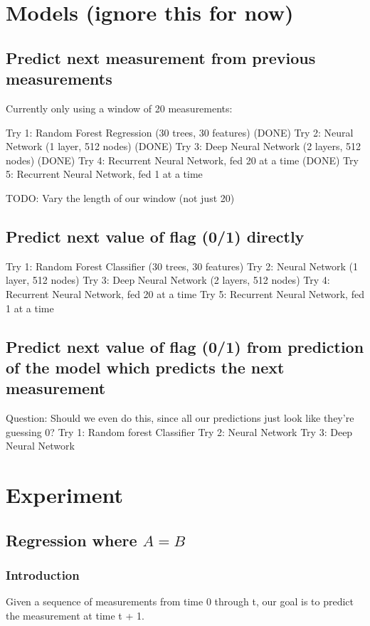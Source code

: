 \documentclass[12pt]{article}
\renewcommand{\=}[1]{\stackrel{#1}{=}} %
\theoremstyle{definition}
\begin{document}
\section{Models (ignore this for now)}
\subsection{Predict next measurement from previous measurements}
Currently only using a window of 20 measurements:

Try 1: Random Forest Regression (30 trees, 30 features) (DONE)
Try 2: Neural Network (1 layer, 512 nodes) (DONE)
Try 3: Deep Neural Network (2 layers, 512 nodes) (DONE)
Try 4: Recurrent Neural Network, fed 20 at a time (DONE)
Try 5: Recurrent Neural Network, fed 1 at a time

TODO: Vary the length of our window (not just 20)

\subsection{Predict next value of flag (0/1) directly}
Try 1: Random Forest Classifier (30 trees, 30 features)
Try 2: Neural Network (1 layer, 512 nodes) 
Try 3: Deep Neural Network (2 layers, 512 nodes) 
Try 4: Recurrent Neural Network, fed 20 at a time
Try 5: Recurrent Neural Network, fed 1 at a time

\subsection{Predict next value of flag (0/1) from prediction of the model which predicts the next measurement}
Question: Should we even do this, since all our predictions just look like they're guessing 0?
Try 1: Random forest Classifier 
Try 2: Neural Network
Try 3: Deep Neural Network

\section{Experiment}
\subsection{Regression where $A = B$}
\subsubsection{Introduction}
Given a sequence of measurements from time 0 through t, our goal is to predict the measurement at time t + 1.
\end{document}
